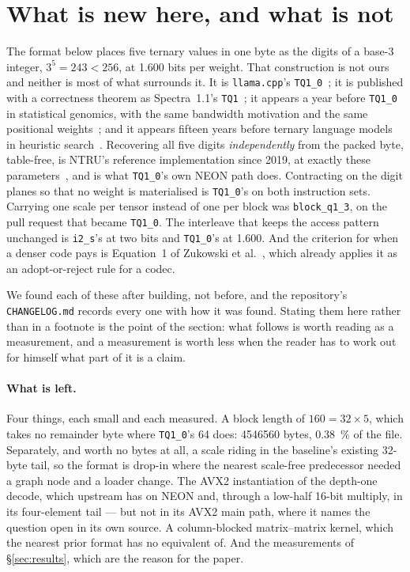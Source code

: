 \documentclass[11pt,a4paper]{article}
\newcommand{\code}[1]{\texttt{#1}}
\begin{document}
\section{What is new here, and what is not}\label{sec:not-new}

The format below places five ternary values in one byte as the digits of a
base-3 integer, $3^{5}=243<256$, at \num{1.600} bits per weight. That
construction is not ours and neither is most of what surrounds it. It is
\code{llama.cpp}'s \code{TQ1\_0}~\cite{tq10}; it is published with a correctness
theorem as Spectra~1.1's \code{TQ1}~\cite{spectra}; it appears a year before \code{TQ1\_0}
in statistical genomics, with the same bandwidth motivation and the same
positional weights~\cite{miraculix}; and it appears fifteen years before ternary
language models in heuristic search~\cite{breyerkorf}. Recovering all five
digits \emph{independently} from the packed byte, table-free, is NTRU's
reference implementation since 2019, at exactly these parameters~\cite{ntru},
and is what \code{TQ1\_0}'s own NEON path does. Contracting on the digit planes
so that no weight is materialised is \code{TQ1\_0}'s on both instruction sets.
Carrying one scale per tensor instead of one per block was \code{block\_q1\_3},
on the pull request that became \code{TQ1\_0}. The interleave that keeps the
access pattern unchanged is \code{i2\_s}'s at two bits and \code{TQ1\_0}'s at
\num{1.600}. And the criterion for when a denser code pays is Equation~1 of
Zukowski et al.~\cite{zukowski}, which already applies it as an adopt-or-reject
rule for a codec.

We found each of these after building, not before, and the repository's
\code{CHANGELOG.md} records every one with how it was found. Stating them here
rather than in a footnote is the point of the section: what follows is
worth reading as a measurement, and a measurement is worth less when the reader
has to work out for himself what part of it is a claim.

\paragraph{What is left.} Four things, each small and each measured.
A block length of $160=32\times5$, which takes no remainder byte where
\code{TQ1\_0}'s \num{64} does: \num{4546560} bytes, \SI{0.38}{\percent} of
the file. Separately, and worth no bytes at all, a scale riding in the
baseline's existing 32-byte tail, so the format is drop-in where the nearest
scale-free predecessor needed a graph node and a loader change. The AVX2 instantiation of the depth-one decode,
which upstream has on NEON and, through a low-half 16-bit multiply, in its
four-element tail --- but not in its AVX2 main path, where it names the question
open in its own source.
A column-blocked matrix--matrix kernel, which the nearest prior format has no
equivalent of. And the measurements of \S\ref{sec:results}, which are the
reason for the paper.
\end{document}
